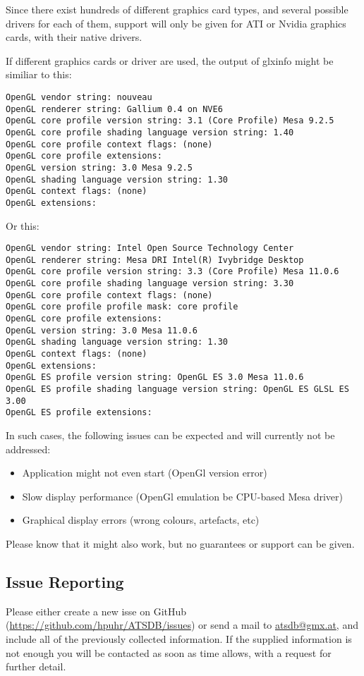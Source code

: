 Since there exist hundreds of different graphics card types, and several possible drivers for each of them, support will only be given for ATI or Nvidia graphics cards, with their native drivers.

If different graphics cards or driver are used, the output of glxinfo might be similiar to this:

\begin{verbatim}
OpenGL vendor string: nouveau
OpenGL renderer string: Gallium 0.4 on NVE6
OpenGL core profile version string: 3.1 (Core Profile) Mesa 9.2.5
OpenGL core profile shading language version string: 1.40
OpenGL core profile context flags: (none)
OpenGL core profile extensions:
OpenGL version string: 3.0 Mesa 9.2.5
OpenGL shading language version string: 1.30
OpenGL context flags: (none)
OpenGL extensions:
\end{verbatim}

Or this:

\begin{verbatim}
OpenGL vendor string: Intel Open Source Technology Center
OpenGL renderer string: Mesa DRI Intel(R) Ivybridge Desktop 
OpenGL core profile version string: 3.3 (Core Profile) Mesa 11.0.6
OpenGL core profile shading language version string: 3.30
OpenGL core profile context flags: (none)
OpenGL core profile profile mask: core profile
OpenGL core profile extensions:
OpenGL version string: 3.0 Mesa 11.0.6
OpenGL shading language version string: 1.30
OpenGL context flags: (none)
OpenGL extensions:
OpenGL ES profile version string: OpenGL ES 3.0 Mesa 11.0.6
OpenGL ES profile shading language version string: OpenGL ES GLSL ES 3.00
OpenGL ES profile extensions:
\end{verbatim}

In such cases, the following issues can be expected and will currently not be addressed:

\begin{itemize} 
\item Application might not even start (OpenGl version error)
\item Slow display performance (OpenGl emulation be CPU-based Mesa driver)
\item Graphical display errors (wrong colours, artefacts, etc) 
\end{itemize} 

Please know that it might also work, but no guarantees or support can be given.

\subsection{Issue Reporting}

Please either create a new isse on GitHub (\url{https://github.com/hpuhr/ATSDB/issues}) or send a mail to \href{mailto:atsdb@gmx.at}{atsdb@gmx.at}, and include all of the previously collected information. If the supplied information is not enough you will be contacted as soon as time allows, with a request for further detail.


